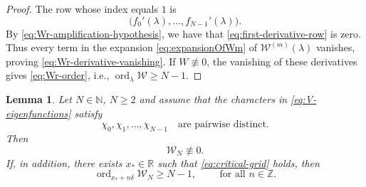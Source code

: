 \documentclass[11pt]{amsart}
\numberwithin{equation}{section}
\newtheorem{lemma}[theorem]{Lemma}
\theoremstyle{definition}
\theoremstyle{remark}
\newcommand{\R}{\mathbb R}
\newcommand{\Z}{\mathbb Z}
\newcommand{\N}{\mathbb N}
\newcommand{\cW}{\mathcal W}
\newcommand{\ord}{\operatorname{ord}}
\begin{document}
\begin{proof}
    The row whose index equals $1$ is
    \begin{equation}\label{eq:first-derivative-row}
        \bigl(f_0'(\lambda),\ldots,f_{N-1}'(\lambda)\bigr).
    \end{equation}
    By \eqref{eq:Wr-amplification-hypothesis}, we have that \eqref{eq:first-derivative-row} is zero. Thus every term in the expansion \eqref{eq:expansionOfWm} of $\cW^{(m)}(\lambda)$ vanishes, proving \eqref{eq:Wr-derivative-vanishing}. If $W\not\equiv0$, the vanishing of these derivatives gives \eqref{eq:Wr-order}, i.e., $\ord_\lambda \cW \geq N-1$.
\end{proof}


\begin{lemma}
\label{lem:independence-multiplicity}
Let $N \in \N$, $N \geq 2$ and assume that the characters in \eqref{eq:V-eigenfunctions} satisfy
\begin{equation}\label{eq:distinct-characters}
  \chi_0,\chi_1,\ldots,\chi_{N-1}
  \quad\text{are pairwise distinct}.
\end{equation}
Then
\begin{equation}\label{eq:alternative-W-nonzero}
    \cW_N\not\equiv0.
\end{equation}
If, in addition, there exists $x_*\in\R$ such that
\eqref{eq:critical-grid} holds, then
\begin{equation}\label{eq:alternative-W-multiplicity}
    \ord_{x_*+n\delta}\cW_N
    \geq N-1,
    \qquad \text{ for all } n\in\Z.
\end{equation}
\end{lemma}
\end{document}

